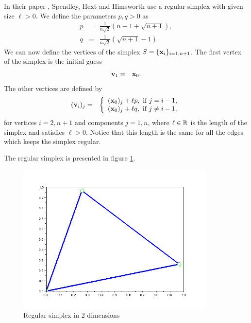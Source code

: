 In their paper \cite{Spendley1962}, Spendley, Hext and Himsworth use a regular 
simplex with given size $\ell>0$. We define the parameters $p,q>0$ as 
\begin{eqnarray}
p &=& \frac{1}{n\sqrt{2}} \left(n-1 + \sqrt{n+1}\right), \\
q &=& \frac{1}{n\sqrt{2}} \left(\sqrt{n+1} - 1\right).
\end{eqnarray}
We can now define the vertices of the simplex $S=\{\mathbf{x}_i\}_{i=1,n+1}$.
The first vertex of the simplex is the initial guess 
\begin{eqnarray}
\mathbf{v}_1 &=& \mathbf{x}_0.
\end{eqnarray}
The other vertices are defined by 
\begin{eqnarray}
(\mathbf{v}_i)_j &=& 
\left\{
\begin{array}{l}
(\mathbf{x}_0)_j + \ell p, \textrm{ if } j=i-1,\\
(\mathbf{x}_0)_j + \ell q, \textrm{ if } j\neq i-1,\\
\end{array}
\right.
\end{eqnarray}
for vertices $i=2,n+1$ and components $j=1,n$, 
where $\ell \in\mathbb{R}$ is the length of the simplex and satisfies $\ell>0$. Notice that this 
length is the same for all the edges which keeps the simplex regular.

The regular simplex is presented in figure \ref{fig-nm-simplex-regular}.

\begin{figure}
\begin{center}
\includegraphics[width=10cm]{simplextheory/simplex_regular.png}
\end{center}
\caption{Regular simplex in 2 dimensions}
\label{fig-nm-simplex-regular}
\end{figure}

